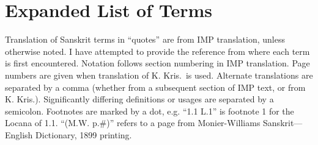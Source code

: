 \documentclass[10pt]{article}
\begin{document}
\newpage


\section{Expanded List of Terms}

Translation of Sanskrit terms in ``quotes'' are from IMP translation, unless otherwise noted.
I have attempted to provide the reference from where each term is first encountered.
Notation follows section numbering in IMP translation. Page numbers are given when translation of K. Kris.\ is used.
Alternate translations are separated by a comma (whether from a subsequent section of IMP text, or from K. Kris.).
Significantly differing definitions or usages are separated by a semicolon.
Footnotes are marked by a dot, e.g. ``1.1 L.1'' is footnote 1 for the Locana of 1.1.
``(M.W. p.\#)'' refers to a page from Monier-Williams Sanskrit---English Dictionary, 1899 printing.
\end{document}
